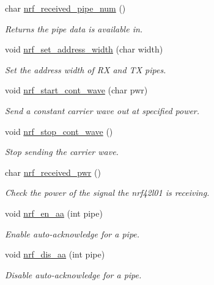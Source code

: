 \begin{DoxyCompactItemize}
char \hyperlink{group___user_func_ga8ca9456023217dc20dad11bf5f5682e0}{nrf\+\_\+received\+\_\+pipe\+\_\+num} ()
\begin{DoxyCompactList}\small\item\em Returns the pipe data is available in. \end{DoxyCompactList}\item 
void \hyperlink{group___user_func_ga79ae591959bfbf33e42d91df58447771}{nrf\+\_\+set\+\_\+address\+\_\+width} (char width)
\begin{DoxyCompactList}\small\item\em Set the address width of RX and TX pipes. \end{DoxyCompactList}\item 
void \hyperlink{group___user_func_ga5d7cce4e1b636fabeb1b2f831cb0be88}{nrf\+\_\+start\+\_\+cont\+\_\+wave} (char pwr)
\begin{DoxyCompactList}\small\item\em Send a constant carrier wave out at specified power. \end{DoxyCompactList}\item 
void \hyperlink{group___user_func_ga2a7db2b3a11078b67e7d10f6a84ef151}{nrf\+\_\+stop\+\_\+cont\+\_\+wave} ()
\begin{DoxyCompactList}\small\item\em Stop sending the carrier wave. \end{DoxyCompactList}\item 
char \hyperlink{group___user_func_ga2335bab20b9cea17169bee98a9c69ce1}{nrf\+\_\+received\+\_\+pwr} ()
\begin{DoxyCompactList}\small\item\em Check the power of the signal the nrf42l01 is receiving. \end{DoxyCompactList}\item 
void \hyperlink{group___user_func_gaa8b472c03dfdf4c5057e51014938e2c5}{nrf\+\_\+en\+\_\+aa} (int pipe)
\begin{DoxyCompactList}\small\item\em Enable auto-\/acknowledge for a pipe. \end{DoxyCompactList}\item 
void \hyperlink{group___user_func_ga0c61d78f6f37370e11ebe21fd70f4cc4}{nrf\+\_\+dis\+\_\+aa} (int pipe)
\begin{DoxyCompactList}\small\item\em Disable auto-\/acknowledge for a pipe. \end{DoxyCompactList}\item 

\end{DoxyCompactItemize}
